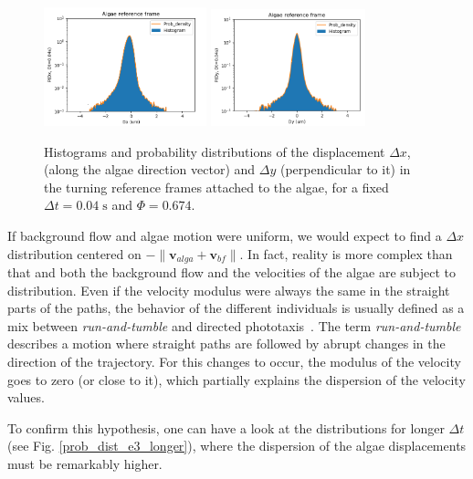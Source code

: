 \begin{figure}[H]
	\centering
	\includegraphics[width=0.42\textwidth]{archivos/pdf_x_e3.png}
	\includegraphics[width=0.4\textwidth]{archivos/pdf_y_e3.png}
	\caption{Histograms and probability distributions of the displacement $\Delta x$, (along the algae direction vector) and $\Delta y$ (perpendicular to it) in the turning reference frames attached to the algae, for a fixed $\Delta t = 0.04 \; \textrm{s}$ and $\Phi = 0.674$.}
	\label{prob_dist_e3}
\end{figure}

If background flow and algae motion were uniform, we would expect to find a $\Delta x$ distribution centered on $-\| \mathbf{v}_{alga} + \mathbf{v}_{bf} \|$. In fact, reality is more complex than that and both the background flow and the velocities of the algae are subject to distribution. Even if the velocity modulus were always the same in the straight parts of the paths, the behavior of the different individuals is usually defined as a mix between \textit{run-and-tumble} and directed phototaxis~\cite{Polin}. The term \textit{run-and-tumble} describes a motion where straight paths are followed by abrupt changes in the direction of the trajectory. For this changes to occur, the modulus of the velocity goes to zero (or close to it), which partially explains the dispersion of the velocity values.

To confirm this hypothesis, one can have a look at the distributions for longer $\Delta t$ (see Fig. \ref{prob_dist_e3_longer}), where the dispersion of the algae displacements must be remarkably higher.
 
